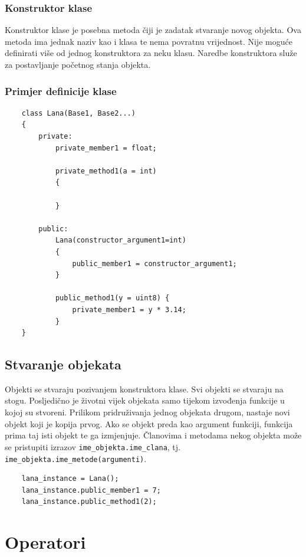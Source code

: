 \documentclass[times, utf8, zavrsni]{fer}
\begin{document}
\subsubsection{Konstruktor klase}
Konstruktor klase je posebna metoda čiji je zadatak stvaranje novog objekta. Ova metoda ima jednak naziv kao i klasa te nema povratnu vrijednost. Nije moguće 
definirati više od jednog konstruktora za neku klasu. Naredbe konstruktora služe za postavljanje početnog stanja objekta.

\subsubsection{Primjer definicije klase}
\begin{verbatim}
    class Lana(Base1, Base2...)
    {
        private:
            private_member1 = float;

            private_method1(a = int)
            {

            }
        
        public:
            Lana(constructor_argument1=int)
            {
                public_member1 = constructor_argument1;
            }
            
            public_method1(y = uint8) {
                private_member1 = y * 3.14;
            }
    }
\end{verbatim}

\subsection{Stvaranje objekata}
Objekti se stvaraju pozivanjem konstruktora klase. Svi objekti se stvaraju na stogu. Posljedično je životni vijek objekata samo tijekom izvođenja funkcije u kojoj su stvoreni.
Prilikom pridruživanja jednog objekata drugom, nastaje novi objekt koji je kopija prvog. Ako se objekt preda kao argument funkciji, funkcija prima taj isti objekt te
ga izmjenjuje. Članovima i metodama nekog objekta može se pristupiti izrazov \verb|ime_objekta.ime_clana|, tj. \verb|ime_objekta.ime_metode(argumenti)|.

\begin{verbatim}
    lana_instance = Lana();
    lana_instance.public_member1 = 7;
    lana_instance.public_method1(2);
\end{verbatim}

\section{Operatori}
\end{document}
